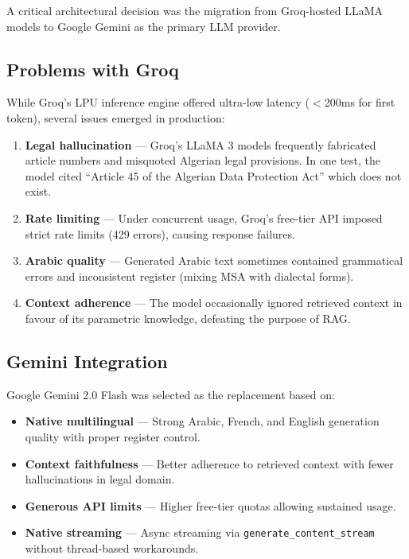\documentclass[12pt, a4paper]{article}
\begin{document}
A critical architectural decision was the migration from Groq-hosted LLaMA
models to Google Gemini as the primary LLM provider.

\subsection{Problems with Groq}

While Groq's LPU inference engine offered ultra-low latency ($<$200ms for
first token), several issues emerged in production:

\begin{enumerate}[leftmargin=2em]
  \item \textbf{Legal hallucination} --- Groq's LLaMA 3 models frequently
        fabricated article numbers and misquoted Algerian legal provisions.
        In one test, the model cited ``Article 45 of the Algerian Data
        Protection Act'' which does not exist.
  \item \textbf{Rate limiting} --- Under concurrent usage, Groq's free-tier
        API imposed strict rate limits (429 errors), causing response failures.
  \item \textbf{Arabic quality} --- Generated Arabic text sometimes contained
        grammatical errors and inconsistent register (mixing MSA with
        dialectal forms).
  \item \textbf{Context adherence} --- The model occasionally ignored
        retrieved context in favour of its parametric knowledge, defeating
        the purpose of RAG.
\end{enumerate}

\subsection{Gemini Integration}

Google Gemini 2.0 Flash was selected as the replacement based on:
\begin{itemize}[leftmargin=2em]
  \item \textbf{Native multilingual} --- Strong Arabic, French, and English
        generation quality with proper register control.
  \item \textbf{Context faithfulness} --- Better adherence to retrieved
        context with fewer hallucinations in legal domain.
  \item \textbf{Generous API limits} --- Higher free-tier quotas allowing
        sustained usage.
  \item \textbf{Native streaming} --- Async streaming via
        \texttt{generate\_content\_stream} without thread-based workarounds.
\end{itemize}
\end{document}
